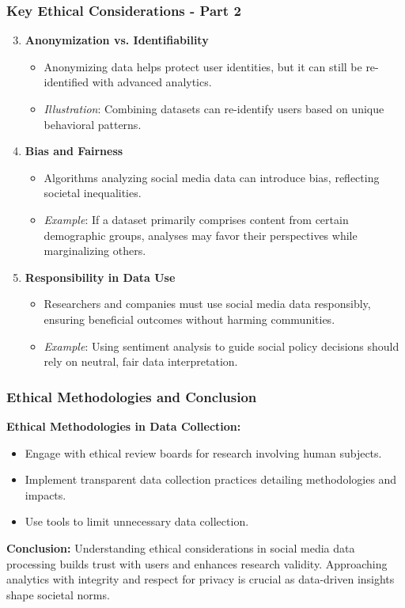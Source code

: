 \documentclass{beamer}
\begin{document}
\begin{frame}[fragile]
    \frametitle{Key Ethical Considerations - Part 2}
    \begin{enumerate}
        \setcounter{enumi}{2} %
        \item \textbf{Anonymization vs. Identifiability}
            \begin{itemize}
                \item Anonymizing data helps protect user identities, but it can still be re-identified with advanced analytics.
                \item \textit{Illustration}: Combining datasets can re-identify users based on unique behavioral patterns.
            \end{itemize}
        \item \textbf{Bias and Fairness}
            \begin{itemize}
                \item Algorithms analyzing social media data can introduce bias, reflecting societal inequalities.
                \item \textit{Example}: If a dataset primarily comprises content from certain demographic groups, analyses may favor their perspectives while marginalizing others.
            \end{itemize}
        \item \textbf{Responsibility in Data Use}
            \begin{itemize}
                \item Researchers and companies must use social media data responsibly, ensuring beneficial outcomes without harming communities.
                \item \textit{Example}: Using sentiment analysis to guide social policy decisions should rely on neutral, fair data interpretation.
            \end{itemize}
    \end{enumerate}
\end{frame}

\begin{frame}[fragile]
    \frametitle{Ethical Methodologies and Conclusion}
    \textbf{Ethical Methodologies in Data Collection:}
    \begin{itemize}
        \item Engage with ethical review boards for research involving human subjects.
        \item Implement transparent data collection practices detailing methodologies and impacts.
        \item Use tools to limit unnecessary data collection.
    \end{itemize}

    \textbf{Conclusion:}
    Understanding ethical considerations in social media data processing builds trust with users and enhances research validity. Approaching analytics with integrity and respect for privacy is crucial as data-driven insights shape societal norms.
\end{frame}
\end{document}
